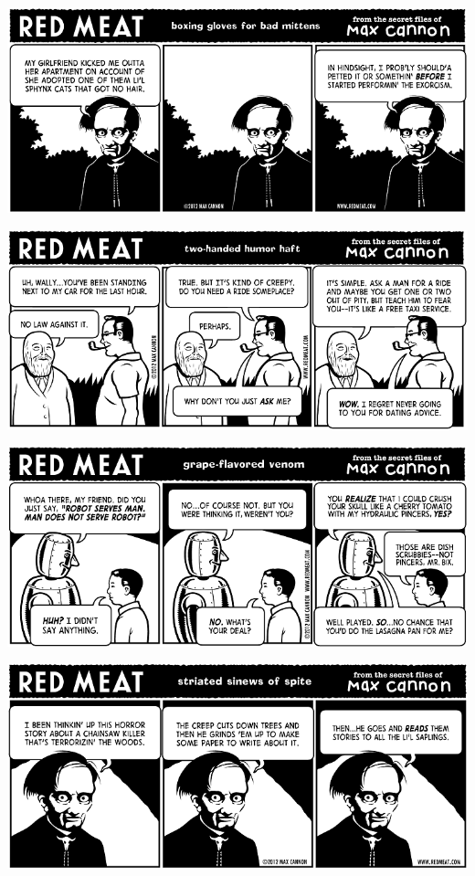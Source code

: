 \documentclass[a4paper,twoside,11pt]{article}
\begin{document}
\includegraphics[width=\textwidth]{redmeat_2012-04-03.png}



\includegraphics[width=\textwidth]{redmeat_2012-04-10.png}



\includegraphics[width=\textwidth]{redmeat_2012-04-17.png}



\includegraphics[width=\textwidth]{redmeat_2012-04-24.png}
\end{document}
